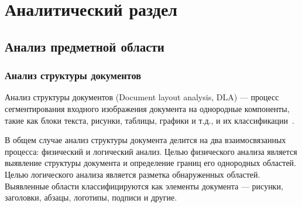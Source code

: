 \section{Аналитический раздел}




\subsection{Анализ предметной области}


\subsubsection{Анализ структуры документов}

Анализ структуры документов (Document layout analysis, DLA) --- процесс сегментирования входного изображения документа на однородные компоненты, такие как блоки текста, рисунки, таблицы, графики и т.д., и их классификации~\cite{tnt}.

В общем случае анализ структуры документа делится на два взаимосвязанных процесса: физический и логический анализ.
Целью физического анализа является выявление структуры документа и определение границ его однородных областей.
Целью логического анализа является разметка обнаруженных областей. Выявленные области классифицируются как элементы документа --- рисунки, заголовки, абзацы, логотипы, подписи и другие.~\cite{dla-survey}

